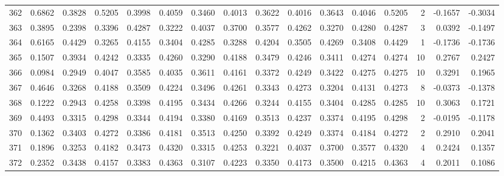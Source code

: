 \begin{tabular}{lrrrrrrrrrrrrrrr}
362 &      0.6862 &  0.3828 &  0.5205 &  0.3998 &  0.4059 &  0.3460 &  0.4013 &  0.3622 &  0.4016 &  0.3643 &   0.4046 &     0.5205 &      2 &                   -0.1657 &                    -0.3034 \\
363 &      0.3895 &  0.2398 &  0.3396 &  0.4287 &  0.3222 &  0.4037 &  0.3700 &  0.3577 &  0.4262 &  0.3270 &   0.4280 &     0.4287 &      3 &                    0.0392 &                    -0.1497 \\
364 &      0.6165 &  0.4429 &  0.3265 &  0.4155 &  0.3404 &  0.4285 &  0.3288 &  0.4204 &  0.3505 &  0.4269 &   0.3408 &     0.4429 &      1 &                   -0.1736 &                    -0.1736 \\
365 &      0.1507 &  0.3934 &  0.4242 &  0.3335 &  0.4260 &  0.3290 &  0.4188 &  0.3479 &  0.4246 &  0.3411 &   0.4274 &     0.4274 &     10 &                    0.2767 &                     0.2427 \\
366 &      0.0984 &  0.2949 &  0.4047 &  0.3585 &  0.4035 &  0.3611 &  0.4161 &  0.3372 &  0.4249 &  0.3422 &   0.4275 &     0.4275 &     10 &                    0.3291 &                     0.1965 \\
367 &      0.4646 &  0.3268 &  0.4188 &  0.3509 &  0.4224 &  0.3496 &  0.4261 &  0.3343 &  0.4273 &  0.3204 &   0.4131 &     0.4273 &      8 &                   -0.0373 &                    -0.1378 \\
368 &      0.1222 &  0.2943 &  0.4258 &  0.3398 &  0.4195 &  0.3434 &  0.4266 &  0.3244 &  0.4155 &  0.3404 &   0.4285 &     0.4285 &     10 &                    0.3063 &                     0.1721 \\
369 &      0.4493 &  0.3315 &  0.4298 &  0.3344 &  0.4194 &  0.3380 &  0.4169 &  0.3513 &  0.4237 &  0.3374 &   0.4195 &     0.4298 &      2 &                   -0.0195 &                    -0.1178 \\
370 &      0.1362 &  0.3403 &  0.4272 &  0.3386 &  0.4181 &  0.3513 &  0.4250 &  0.3392 &  0.4249 &  0.3374 &   0.4184 &     0.4272 &      2 &                    0.2910 &                     0.2041 \\
371 &      0.1896 &  0.3253 &  0.4182 &  0.3473 &  0.4320 &  0.3315 &  0.4253 &  0.3221 &  0.4037 &  0.3700 &   0.3577 &     0.4320 &      4 &                    0.2424 &                     0.1357 \\
372 &      0.2352 &  0.3438 &  0.4157 &  0.3383 &  0.4363 &  0.3107 &  0.4223 &  0.3350 &  0.4173 &  0.3500 &   0.4215 &     0.4363 &      4 &                    0.2011 &                     0.1086 \\

\end{tabular}
